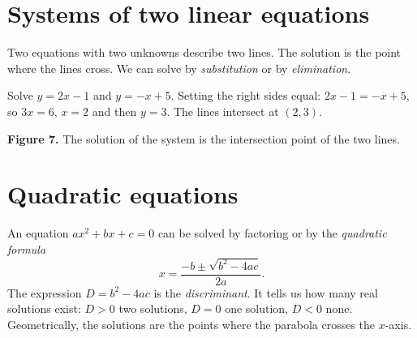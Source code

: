 \section*{Systems of two linear equations}
Two equations with two unknowns describe two lines. The solution is the point where the lines cross. We can solve by \emph{substitution} or by \emph{elimination}.

\begin{example}
Solve $y=2x-1$ and $y=-x+5$. Setting the right sides equal: $2x-1=-x+5$, so $3x=6$, $x=2$ and then $y=3$. The lines intersect at $(2,3)$.
\end{example}

\begin{center}

\small\textbf{Figure 7.} The solution of the system is the intersection point of the two lines.
\end{center}

\section*{Quadratic equations}
An equation $ax^2+bx+c=0$ can be solved by factoring or by the \emph{quadratic formula}
\[
x=\frac{-b\pm\sqrt{b^2-4ac}}{2a}.
\]
The expression $D=b^2-4ac$ is the \emph{discriminant}. It tells us how many real solutions exist: $D>0$ two solutions, $D=0$ one solution, $D<0$ none. Geometrically, the solutions are the points where the parabola crosses the $x$-axis.

